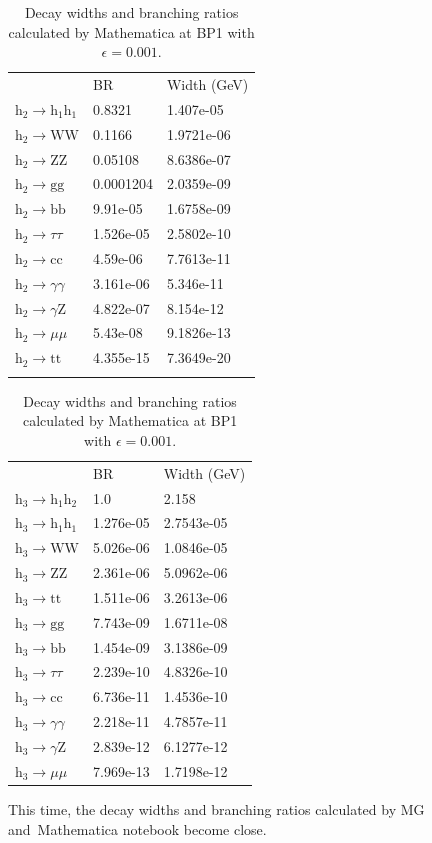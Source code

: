 \documentclass[12pt]{article}
\begin{document}
	\begin{table}[htpb]
		\centering
		\caption{Decay widths and branching ratios calculated by Mathematica at BP1 with $\epsilon=0.001$.}
		\label{tab:MA_decay_widths_BR_0001}
		\begin{tabular}{lll}
								  & BR        & Width (GeV) \\
			$\text{h}_2\to\text{h}_1\text{h}_1$ & 0.8321    & 1.407e-05   \\
			$\text{h}_2\to\text{WW}$   & 0.1166    & 1.9721e-06  \\
			$\text{h}_2\to\text{ZZ}$   & 0.05108   & 8.6386e-07  \\
			$\text{h}_2\to\text{gg}$   & 0.0001204 & 2.0359e-09  \\
			$\text{h}_2\to\text{bb}$   & 9.91e-05  & 1.6758e-09  \\
			$\text{h}_2\to\tau\tau$   & 1.526e-05 & 2.5802e-10  \\
			$\text{h}_2\to\text{cc}$   & 4.59e-06  & 7.7613e-11  \\
			$\text{h}_2\to\gamma\gamma$   & 3.161e-06 & 5.346e-11   \\
			$\text{h}_2\to\gamma\text{Z}$  & 4.822e-07 & 8.154e-12   \\
			$\text{h}_2\to\mu\mu$   & 5.43e-08  & 9.1826e-13  \\
			$\text{h}_2\to\text{tt}$   & 4.355e-15 & 7.3649e-20  \\
			\\
		\end{tabular}
		\begin{tabular}{lll}
								  & BR        & Width (GeV) \\
			$\text{h}_3\to\text{h}_1\text{h}_2$ & 1.0       & 2.158       \\
			$\text{h}_3\to\text{h}_1\text{h}_1$ & 1.276e-05 & 2.7543e-05  \\
			$\text{h}_3\to\text{WW}$   & 5.026e-06 & 1.0846e-05  \\
			$\text{h}_3\to\text{ZZ}$   & 2.361e-06 & 5.0962e-06  \\
			$\text{h}_3\to\text{tt}$   & 1.511e-06 & 3.2613e-06  \\
			$\text{h}_3\to\text{gg}$   & 7.743e-09 & 1.6711e-08  \\
			$\text{h}_3\to\text{bb}$   & 1.454e-09 & 3.1386e-09  \\
			$\text{h}_3\to\tau\tau$   & 2.239e-10 & 4.8326e-10  \\
			$\text{h}_3\to\text{cc}$   & 6.736e-11 & 1.4536e-10  \\
			$\text{h}_3\to\gamma\gamma$   & 2.218e-11 & 4.7857e-11  \\
			$\text{h}_3\to\gamma\text{Z}$   & 2.839e-12 & 6.1277e-12  \\
			$\text{h}_3\to\mu\mu$   & 7.969e-13 & 1.7198e-12  
		\end{tabular}
	\end{table}
	This time, the decay widths and branching ratios calculated by MG and Mathematica notebook become close.
\end{document}
